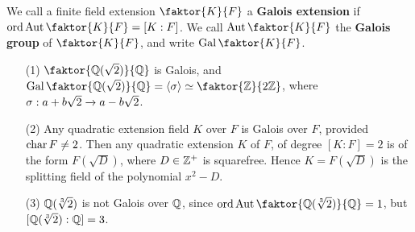 \begin{definition}
    We call a finite field extension $\faktor{K}{F}$ a \textbf{Galois extension}
    if $\ord{\Aut{\faktor{K}{F}}}=[K:F]$. We call $\Aut{\faktor{K}{F}}$ the
    \textbf{Galois group} of $\faktor{K}{F}$, and write $\Gal{\faktor{K}{F}}$.
\end{definition}

\begin{example}\label{example_2.3}
    \begin{enumerate}
        \item[(1)] $\faktor{\Q(\sqrt{2})}{\Q}$ is Galois, and
            $\Gal{\faktor{\Q(\sqrt{2})}{\Q}}=\langle \s \rangle \simeq
            \faktor{\Z}{2\Z}$, where $\sigma:a+b\sqrt{2} \xrightarrow{}
            a-b\sqrt{2}$.

        \item[(2)] Any quadratic extension field $K$ over  $F$ is Galois over
            $F$, provided  $\operatorname{char}{F} \neq 2$. Then any quadratic extension $K$
            of  $F$, of degree  $[K:F]=2$ is of the form $F(\sqrt{D})$, where $D
            \in \mathbb{Z}^+$ is squarefree. Hence $K=F(\sqrt{D})$ is the splitting
            field of the polynomial $x^2-D$.

        \item[(3)] $\mathbb{Q}(\sqrt[3]{2})$ is not Galois over $\mathbb{Q}$, since
            $\ord{\Aut{\faktor{\Q(\sqrt[3]{2})}{\Q}}}=1$, but
            $[\mathbb{Q}(\sqrt[3]{2}):\mathbb{Q}]=3$.


\end{enumerate}
\end{example}
